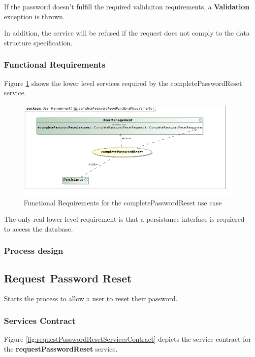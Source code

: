 If the password doesn't fulfill the required validaiton requirements, a \textbf{Validation} exception is thrown.

In addition, the service will be refused if the request does not comply to the data structure specification.

\subsubsection{Functional Requirements}
Figure \ref{fig:completePasswordResetFunctionalRequirements} shows the lower
level services required by the completePasswordReset service.

\begin{figure}[H]
	\begin{center}
		\includegraphics[scale=0.55]{../Diagrams and Charts/Users/completePasswordResetFunctionalRequirements.jpg}
		\caption{Functional Requirements for the completePasswordReset use case}
		\label{fig:completePasswordResetFunctionalRequirements}
	\end{center}
\end{figure}

The only real lower level requirement is that a persistance interface is requiered
to access the database.

\subsubsection{Process design}

\subsection{Request Password Reset}
Starts the process to allow a user to reset their password.

\subsubsection{Services Contract}
Figure \ref{fig:requestPasswordResetServicesContract} depicts the service contract for the \textbf{requestPasswordReset} service.

